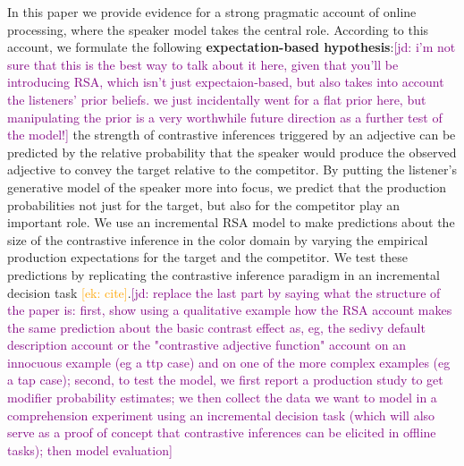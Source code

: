 \documentclass[10pt,letterpaper]{article}
\newcommand{\ek}[1]{\textcolor{Orange}{[ek: #1]}}
\newcommand{\jd}[1]{\textcolor{Purple}{[jd: #1]}}
\begin{document}


In this paper we provide evidence for a strong pragmatic account of online processing, where the speaker model takes the central role. According to this account, we formulate the following \textbf{expectation-based hypothesis}:\jd{i'm not sure that this is the best way to talk about it here, given that you'll be introducing RSA, which isn't just expectaion-based, but also takes into account the listeners' prior beliefs. we just incidentally went for a flat prior here, but manipulating the prior is a very worthwhile future direction as a further test of the model!} the strength of contrastive inferences triggered by an adjective can be predicted by the relative probability that the speaker would produce the observed adjective to convey the target relative to the competitor. By putting the listener's generative model of the speaker more into focus, we predict that the production probabilities not just for the target, but also for the competitor play an important role. We use an incremental RSA model to make predictions about the size of the contrastive inference in the color domain by varying the empirical production expectations for the target and the competitor. We test these predictions by replicating the contrastive inference paradigm in an incremental decision task \ek{cite}.\jd{replace the last part by saying what the structure of the paper is: first, show using a qualitative example how the RSA account makes the same prediction about the basic contrast effect as, eg, the sedivy default description account or the "contrastive adjective function" account on an innocuous example (eg a ttp case) and on one of the more complex examples (eg a tap case); second, to test the model, we first report a production study to get modifier probability estimates; we then collect the data we want to model in a comprehension experiment using an incremental decision task (which will also serve as a proof of concept that contrastive inferences can be elicited in offline tasks); then model evaluation}
\end{document}
